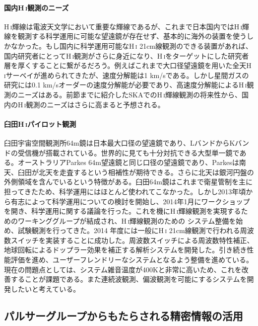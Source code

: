 \paragraph{国内H\,\textsc{i}観測のニーズ}

H\,\textsc{i}輝線は電波天文学において重要な輝線であるが、これまで日本国内ではH\,\textsc{i}輝線を観測する科学運用に可能な望遠鏡が存在せず、基本的に海外の装置を使うしかなかった。もし国内に科学運用可能なH\,\textsc{i} 21cm線観測のできる装置があれば、国内研究者にとってH\,\textsc{i}観測がさらに身近になり、H\,\textsc{i}をターゲットにした研究者層を厚くすることに繋がるだろう。例えばこれまで大口径望遠鏡を用いた全天H\,\textsc{i}サーベイが進められてきたが、速度分解能は1 km/sである。しかし星間ガスの研究には0.1 km/sオーダーの速度分解能が必要であり、高速度分解能によるH\,\textsc{i}観測のニーズはある。前節までに紹介したSKAでのH\,\textsc{i}輝線観測の将来性から、国内のH\,\textsc{i}観測のニーズはさらに高まると予想される。

\paragraph{臼田H\,\textsc{i}パイロット観測}

臼田宇宙空間観測所64m鏡は日本最大口径の望遠鏡であり、LバンドからKバンドの受信機が搭載されている。世界的に見ても十分対抗できる大型単一鏡である。オーストラリアParkes 64m望遠鏡と同じ口径の望遠鏡であり、Parkesは南天、臼田が北天を走査するという相補性が期待できる。さらに北天は銀河円盤の外側領域を含んでいるという特徴がある。臼田64m鏡はこれまで衛星管制を主に担ってきたため、科学運用にはほとんど使われてこなかった。しかし2013年頃から有志によって科学運用についての検討を開始し、2014年1月にワークショップを開き、科学運用に関する議論を行った。これを機にH\,\textsc{i}輝線観測を実現するためのワーキンググループが結成され、H\,\textsc{i}輝線観測のための システム整備を始め、試験観測を行ってきた。2014 年度には一般にH\,\textsc{i} 21cm線観測で行われる周波数スイッチを実装することに成功した。周波数スイッチによる周波数特性補正、地球回転によるドップラー効果を補正する解析システムを開発した。引き続き性能評価を進め、ユーザーフレンドリーなシステムとなるよう整備を進めている。現在の問題点としては、システム雑音温度が400Kと非常に高いため、これを改善することが課題である。また連続波観測、偏波観測を可能にするシステムを開発したいと考えている。


\subsection{パルサーグループからもたらされる精密情報の活用}
\label{c08.s4.ss4}


